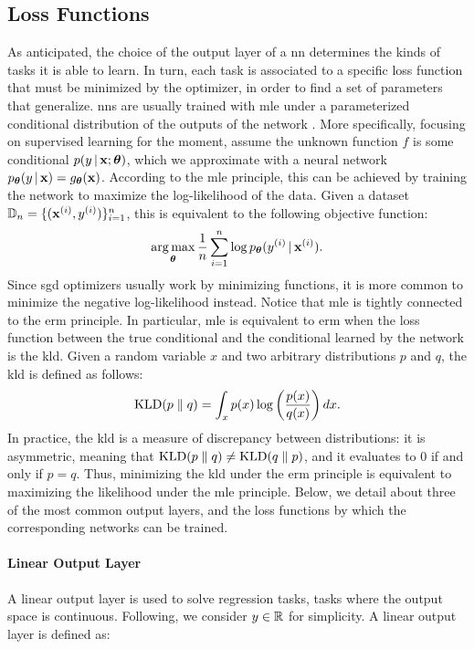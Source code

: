 \subsection{Loss Functions}\label{sec:loss}
As anticipated, the choice of the output layer of a \gls{nn} determines the kinds of tasks it is able to learn. In turn, each task is associated to a specific loss function that must be minimized by the optimizer, in order to find a set of parameters that generalize. \glspl{nn} are usually trained with \gls{mle} under a parameterized conditional distribution of the outputs of the network \citep{goodfellow2016dl}. More specifically, focusing on supervised learning for the moment, assume the unknown function $f$ is some conditional $p(y\given \Vector{x}; \Param)$, which we approximate with a neural network $p_{\Param}(y \given \Vector{x}) = g_{\Param}(\Vector{x})$. According to the \gls{mle} principle, this can be achieved by training the network to maximize the log-likelihood of the data. Given a dataset $\Data_n = \Set{(\VPattern{x}{i}, \Pattern{y}{i})}_{i=1}^n$, this is equivalent to the following objective function:
$$\argmax_{\Param} \frac{1}{n} \sum_{i=1}^n \log p_{\Param}(\Pattern{y}{i} \given \VPattern{x}{i}).$$
Since \gls{sgd} optimizers usually work by minimizing functions, it is more common to minimize the negative log-likelihood instead. Notice that \gls{mle} is tightly connected to the \gls{erm} principle. In particular, \gls{mle} is equivalent to \gls{erm} when the loss function between the true conditional and the conditional learned by the network is the \gls{kld}. Given a random variable $x$ and two arbitrary distributions $p$ and $q$, the \gls{kld} is defined as follows:
$$\mathrm{KLD}(p \;\Vert\; q) = \int_x p(x) \log\left( \frac{p(x)}{q(x)} \right) dx.$$
In practice, the \gls{kld} is a measure of discrepancy between distributions: it is asymmetric, meaning that $\mathrm{KLD}(p \;\Vert\; q) \neq \mathrm{KLD}(q \;\Vert\; p)$, and it evaluates to 0 if and only if $p = q$. Thus, minimizing the \gls{kld} under the \gls{erm} principle is equivalent to maximizing the likelihood under the \gls{mle} principle. Below, we detail about three of the most common output layers, and the loss functions by which the corresponding networks can be trained.

\paragraph{Linear Output Layer}
A linear output layer is used to solve regression tasks, \ie tasks where the output space is continuous. Following, we consider $y \in \mathbb{R}$ for simplicity. A linear output layer is defined as:

